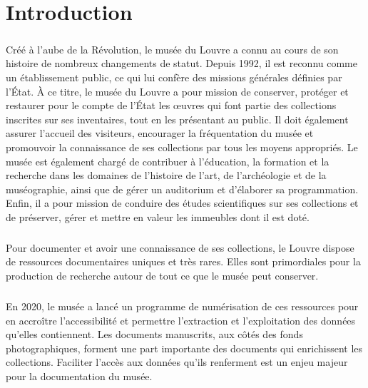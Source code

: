 \documentclass[a4paper,12pt,twoside]{book}
\begin{document}
	

	\newpage{\pagestyle{empty}\cleardoublepage}
	
	\chapter{Introduction}	
	
\paragraph{}
Créé à l’aube de la Révolution, le musée du Louvre a connu au cours de son histoire de nombreux changements de statut. Depuis 1992, il est reconnu comme un établissement public, ce qui lui confère des missions générales définies par l'État. À ce titre, le musée du Louvre a pour mission de conserver, protéger et restaurer pour le compte de l’État les œuvres qui font partie des collections inscrites sur ses inventaires, tout en les présentant au public. Il doit également assurer l'accueil des visiteurs, encourager la fréquentation du musée et promouvoir la connaissance de ses collections par tous les moyens appropriés. Le musée est également chargé de contribuer à l’éducation, la formation et la recherche dans les domaines de l’histoire de l’art, de l’archéologie et de la muséographie, ainsi que de gérer un auditorium et d'élaborer sa programmation. Enfin, il a pour mission de conduire des études scientifiques sur ses collections et de préserver, gérer et mettre en valeur les immeubles dont il est doté.

\paragraph{}
Pour documenter et avoir une connaissance de ses collections, le Louvre dispose de ressources documentaires uniques et très rares. Elles sont primordiales  pour la production de recherche autour de tout ce que le musée peut conserver. 

\paragraph{}
En 2020, le musée a lancé un programme de numérisation de ces ressources pour en accroître l'accessibilité et permettre l'extraction et l'exploitation des données qu'elles contiennent. Les documents manuscrits, aux côtés des fonds photographiques, forment une part importante des documents qui enrichissent les collections. Faciliter l'accès aux données qu'ils renferment est un enjeu majeur pour la documentation du musée. 
\end{document}
